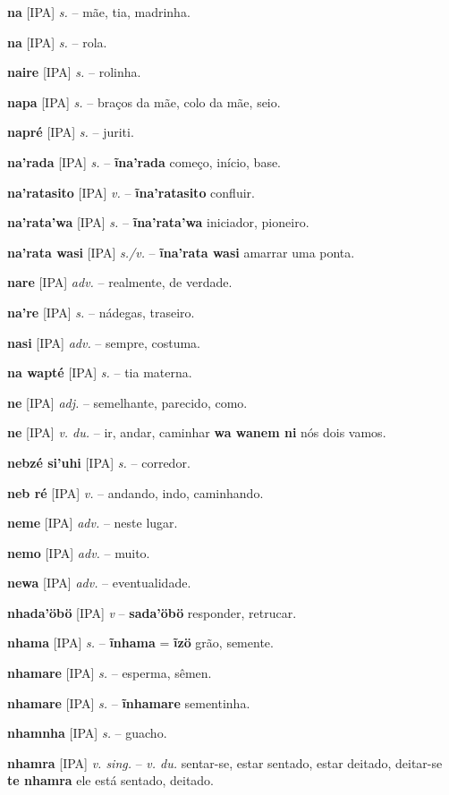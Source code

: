 \textbf{na} [IPA] \textit{s.} -- mãe, tia, madrinha.

\textbf{na} [IPA] \textit{s.} -- rola.

\textbf{naire} [IPA] \textit{s.} -- rolinha.

\textbf{napa} [IPA] \textit{s.} -- braços da mãe, colo da mãe, seio.

\textbf{napré} [IPA] \textit{s.} -- juriti.

\textbf{na'rada} [IPA] \textit{s.} -- \textbf{ĩna'rada} começo, início, base.

\textbf{na'ratasito} [IPA] \textit{v.} -- \textbf{ĩna'ratasito} confluir.

\textbf{na'rata'wa} [IPA] \textit{s.} -- \textbf{ĩna'rata'wa} iniciador, pioneiro.

\textbf{na'rata wasi} [IPA] \textit{s./v.} -- \textbf{ĩna'rata wasi} amarrar uma ponta.

\textbf{nare} [IPA] \textit{adv.} -- realmente, de verdade.

\textbf{na're} [IPA] \textit{s.} -- nádegas, traseiro.

\textbf{nasi} [IPA] \textit{adv.} -- sempre, costuma.

\textbf{na wapté} [IPA] \textit{s.} -- tia materna.

\textbf{ne} [IPA] \textit{adj.} -- semelhante, parecido, como.

\textbf{ne} [IPA] \textit{v. du.} -- ir, andar, caminhar  \textbf{wa wanem ni} nós dois vamos.

\textbf{nebzé si'uhi} [IPA] \textit{s.} -- corredor.

\textbf{neb ré} [IPA] \textit{v.} -- andando, indo, caminhando.

\textbf{neme} [IPA] \textit{adv.} -- neste lugar.

\textbf{nemo} [IPA] \textit{adv.} -- muito.

\textbf{newa} [IPA] \textit{adv.} -- eventualidade.

\textbf{nhada'öbö} [IPA] \textit{v} -- \textbf{sada'öbö} responder, retrucar.

\textbf{nhama} [IPA] \textit{s.} -- \textbf{ĩnhama} = \textbf{ĩzö} grão, semente.

\textbf{nhamare} [IPA] \textit{s.} -- esperma, sêmen.

\textbf{nhamare} [IPA] \textit{s.} -- \textbf{ĩnhamare} sementinha.

\textbf{nhamnha} [IPA] \textit{s.} -- guacho.

\textbf{nhamra} [IPA] \textit{v. sing.} -- \textit{v. du.} sentar-se, estar sentado, estar deitado, deitar-se  \textbf{te nhamra} ele está sentado, deitado.

